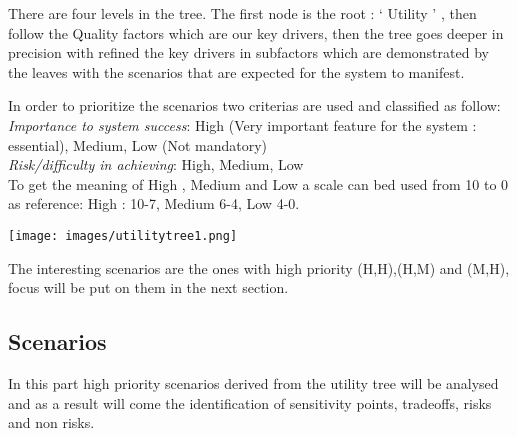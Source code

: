 There are four levels in the tree. The first node is the root : ` Utility ' , then follow the Quality factors which are our key drivers, then the tree goes deeper in precision with refined the key drivers in subfactors which are demonstrated by the leaves with the scenarios that are expected for the system to manifest. 

In order to prioritize the scenarios two criterias are used and classified as follow: \\
\textit{Importance  to system success}: High (Very important feature for the system : essential), Medium, Low (Not mandatory)\\
\textit{ Risk/difficulty in achieving}: High, Medium, Low\\
To get the meaning of High , Medium and Low a scale can bed used from 10 to 0 as reference: High : 10-7, Medium 6-4, Low 4-0.

\texttt{[image: images/utilitytree1.png]}

The interesting scenarios are the ones with high priority (H,H),(H,M) and (M,H), focus will be put on them in the next section.

\subsection{Scenarios}

In this part high priority scenarios derived from the utility tree will be analysed and as a result will come the identification of sensitivity points, tradeoffs, risks and non risks.




